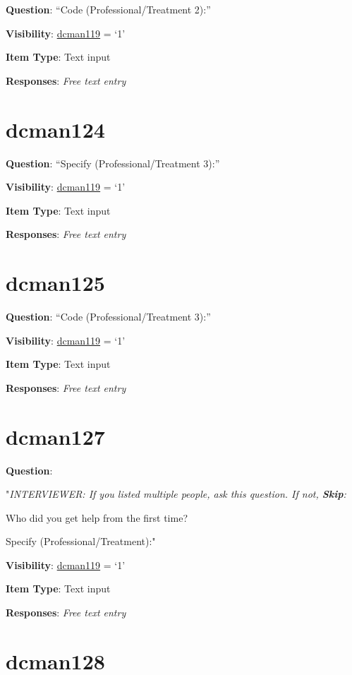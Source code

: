 \documentclass[]{book}
\begin{document}
\textbf{Question}: ``Code (Professional/Treatment 2):''

\textbf{Visibility}: \protect\hyperlink{dcman119}{dcman119} = `1'

\textbf{Item Type}: Text input

\textbf{Responses}: \emph{Free text entry}

\hypertarget{dcman124}{%
\section{dcman124}\label{dcman124}}

\textbf{Question}: ``Specify (Professional/Treatment 3):''

\textbf{Visibility}: \protect\hyperlink{dcman119}{dcman119} = `1'

\textbf{Item Type}: Text input

\textbf{Responses}: \emph{Free text entry}

\hypertarget{dcman125}{%
\section{dcman125}\label{dcman125}}

\textbf{Question}: ``Code (Professional/Treatment 3):''

\textbf{Visibility}: \protect\hyperlink{dcman119}{dcman119} = `1'

\textbf{Item Type}: Text input

\textbf{Responses}: \emph{Free text entry}

\hypertarget{dcman127}{%
\section{dcman127}\label{dcman127}}

\textbf{Question}:

"\emph{INTERVIEWER: If you listed multiple people, ask this question. If not, \textbf{Skip}:}

Who did you get help from the first time?

Specify (Professional/Treatment):"

\textbf{Visibility}: \protect\hyperlink{dcman119}{dcman119} = `1'

\textbf{Item Type}: Text input

\textbf{Responses}: \emph{Free text entry}

\hypertarget{dcman128}{%
\section{dcman128}\label{dcman128}}
\end{document}
